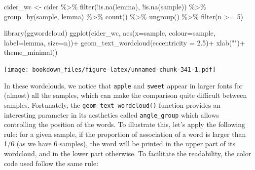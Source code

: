 \documentclass[
]{krantz}
\makeatletter
\newenvironment{Shaded}{\begin{snugshade}}{\end{snugshade}}
\newcommand{\AttributeTok}[1]{\textcolor[rgb]{0.61,0.61,0.61}{#1}}
\newcommand{\DecValTok}[1]{\textcolor[rgb]{0.06,0.06,0.06}{#1}}
\newcommand{\FloatTok}[1]{\textcolor[rgb]{0.06,0.06,0.06}{#1}}
\newcommand{\FunctionTok}[1]{\textcolor[rgb]{0,0,0}{#1}}
\newcommand{\NormalTok}[1]{#1}
\newcommand{\OtherTok}[1]{\textcolor[rgb]{0.37,0.37,0.37}{#1}}
\newcommand{\SpecialCharTok}[1]{\textcolor[rgb]{0,0,0}{#1}}
\newcommand{\StringTok}[1]{\textcolor[rgb]{0.5,0.5,0.5}{#1}}
\newenvironment{kframe}{%
\medskip{}
\setlength{\fboxsep}{.8em}
 \def\at@end@of@kframe{}%
 \ifinner\ifhmode%
  \def\at@end@of@kframe{\end{minipage}}%
  \begin{minipage}{\columnwidth}%
 \fi\fi%
 \def\FrameCommand##1{\hskip\@totalleftmargin \hskip-\fboxsep
 \colorbox{shadecolor}{##1}\hskip-\fboxsep
     \hskip-\linewidth \hskip-\@totalleftmargin \hskip\columnwidth}%
 \MakeFramed {\advance\hsize-\width
   \@totalleftmargin\z@ \linewidth\hsize
   \@setminipage}}%
 {\par\unskip\endMakeFramed%
 \at@end@of@kframe}
\renewenvironment{Shaded}{\begin{kframe}}{\end{kframe}}
\makeatother
\begin{document}
\begin{Shaded}
\begin{Highlighting}[]
\NormalTok{cider\_wc }\OtherTok{\textless{}{-}}\NormalTok{ cider }\SpecialCharTok{\%\textgreater{}\%} 
  \FunctionTok{filter}\NormalTok{(}\SpecialCharTok{!}\FunctionTok{is.na}\NormalTok{(lemma), }\SpecialCharTok{!}\FunctionTok{is.na}\NormalTok{(sample)) }\SpecialCharTok{\%\textgreater{}\%} 
  \FunctionTok{group\_by}\NormalTok{(sample, lemma) }\SpecialCharTok{\%\textgreater{}\%} 
  \FunctionTok{count}\NormalTok{() }\SpecialCharTok{\%\textgreater{}\%} 
  \FunctionTok{ungroup}\NormalTok{() }\SpecialCharTok{\%\textgreater{}\%} 
  \FunctionTok{filter}\NormalTok{(n }\SpecialCharTok{\textgreater{}=} \DecValTok{5}\NormalTok{)}

\FunctionTok{library}\NormalTok{(ggwordcloud)}
\FunctionTok{ggplot}\NormalTok{(cider\_wc, }\FunctionTok{aes}\NormalTok{(}\AttributeTok{x=}\NormalTok{sample, }\AttributeTok{colour=}\NormalTok{sample, }\AttributeTok{label=}\NormalTok{lemma, }\AttributeTok{size=}\NormalTok{n))}\SpecialCharTok{+}
  \FunctionTok{geom\_text\_wordcloud}\NormalTok{(}\AttributeTok{eccentricity =} \FloatTok{2.5}\NormalTok{)}\SpecialCharTok{+}
  \FunctionTok{xlab}\NormalTok{(}\StringTok{""}\NormalTok{)}\SpecialCharTok{+}
  \FunctionTok{theme\_minimal}\NormalTok{()}
\end{Highlighting}
\end{Shaded}

\texttt{[image: bookdown\_files/figure-latex/unnamed-chunk-341-1.pdf]}

In these wordclouds, we notice that \texttt{apple} and \texttt{sweet} appear in larger fonts for (almost) all the samples, which can make the comparison quite difficult between samples. Fortunately, the \texttt{geom\_text\_wordcloud()} function provides an interesting parameter in its aesthetics called \texttt{angle\_group} which allows controlling the position of the words. To illustrate this, let's apply the following rule: for a given sample, if the proportion of association of a word is larger than 1/6 (as we have 6 samples), the word will be printed in the upper part of its wordcloud, and in the lower part otherwise. To facilitate the readability, the color code used follow the same rule:
\end{document}
